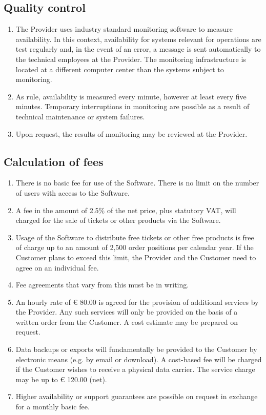 \documentclass{terms}
\begin{document}
\subsection{Quality control}
\begin{enumerate}
\item The Provider uses industry standard monitoring software to measure availability. In this context, availability for systems relevant for operations are test regularly and, in the event of an error, a message is sent automatically to the technical employees at the Provider. The monitoring infrastructure is located at a different computer center than the systems subject to monitoring.
\item As rule, availability is measured every minute, however at least every five minutes. Temporary interruptions in monitoring are possible as a result of technical maintenance or system failures.
\item Upon request, the results of monitoring may be reviewed at the Provider.
\end{enumerate}

\subsection{Calculation of fees}
\label{entgelt}
\begin{enumerate}
\item There is no basic fee for use of the Software. There is no limit on the number of users with access to the Software.
\item A fee in the amount of 2.5\% of the net price, plus statutory VAT, will charged for the sale of tickets or other products via the Software.
\item Usage of the Software to distribute free tickets or other free products is free of charge up to an amount of 2,500 order positions per calendar year. If the Customer plans to exceed this limit, the Provider and the Customer need to agree on an individual fee.
\item Fee agreements that vary from this must be in writing.
\item An hourly rate of € 80.00 is agreed for the provision of additional services by the Provider. Any such services will only be provided on the basis of a written order from the Customer. A cost estimate may be prepared on request.
\item Data backups or exports will fundamentally be provided to the Customer by electronic means (e.g. by email or download). A cost-based fee will be charged if the Customer wishes to receive a physical data carrier. The service charge may be up to € 120.00 (net).
\item Higher availability or support guarantees are possible on request in exchange for a monthly basic fee.
\end{enumerate}
\end{document}
